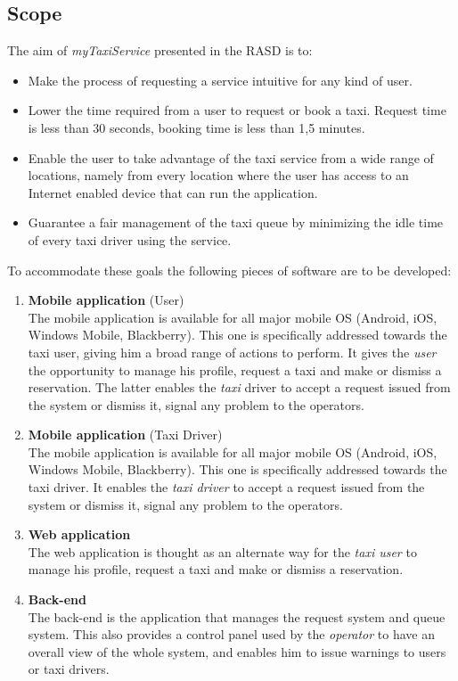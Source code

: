 \documentclass[12pt, a4paper]{article}
\begin{document}
\newpage

\subsection{Scope}

The aim of \emph{myTaxiService} presented in the RASD is to:
\begin{itemize}
\item Make the process of requesting a service intuitive for any kind of user.
\item Lower the time required from a user to request or book a taxi. Request time is less than 30 seconds, booking time is less than 1,5 minutes.
\item Enable the user to take advantage of the taxi service from a wide range of locations, namely from every location where the user has access to an Internet enabled device that can run the application.
\item Guarantee a fair management of the taxi queue by minimizing the idle time of every taxi driver using the service.
\end{itemize}
To accommodate these goals the following pieces of software are to be developed:

\begin{enumerate} [label = \textbf{APP.\arabic*}]
  \item \textbf{Mobile application} (User) \hfill \\
  \label{app:mobileuser}
  The mobile application is available for all major mobile OS (Android, iOS, Windows Mobile, Blackberry).
  This one is specifically addressed towards the taxi user, giving him a broad range of actions to perform.
  It gives the \emph{user} the opportunity to manage his profile, request a taxi and make or dismiss a reservation. %
  The latter enables the \emph{taxi} driver to accept a request issued from the system or dismiss it, signal any problem to the operators.

  \item \textbf{Mobile application} (Taxi Driver) \hfill \\
  \label{app:mobiledriver}
  The mobile application is available for all major mobile OS (Android, iOS, Windows Mobile, Blackberry).
  This one is specifically addressed towards the taxi driver.
  It enables the \emph{taxi driver} to accept a request issued from the system or dismiss it, signal any problem to the operators.

  \item \textbf{Web application} \hfill \\
  \label{app:web}
  The web application is thought as an alternate way for the \emph{taxi user} to manage his profile, request a taxi and make or dismiss a reservation.

  \item \textbf{Back-end} \hfill \\
  \label{app:backend}
  The back-end is the application that manages the request system and queue system. This also provides a control panel used by the \emph{operator} to have an overall view of the whole system, and enables him to issue warnings to users or taxi drivers.
\end{enumerate}
\end{document}
